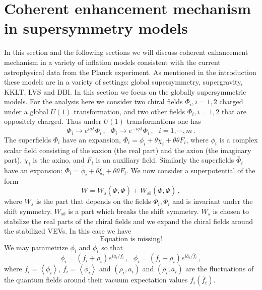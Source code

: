 \documentclass[12pt]{article}
\begin{document}
\section{Coherent enhancement mechanism in supersymmetry models \label{sec:Supersymmetry}}
In this section and the following sections we will discuss coherent enhancement mechanism in a variety of inflation models consistent with the current astrophysical data from the Planck experiment.
As mentioned in the introduction these models are in a variety of settings: global supersymmetry, supergravity, KKLT, LVS and DBI.
In this section we focus on the globally supersymmetric models.
For the analysis here we consider two chiral fields $\Phi_i, i = 1, 2$ charged under a global $U\left(1\right)$ transformation, and two other fields $\bar\Phi_i, i = 1, 2$ that are oppositely charged.
Thus under $U\left(1\right)$ transformations one has
\begin{equation}
  \Phi_i \to e^{i q \lambda} \Phi_i\,,
  ~~~ \bar\Phi_i \to e^{-i q \lambda} \bar\Phi_i\,,
  ~~~ i = 1, \cdots, m\,.
\end{equation}
The superfields $\Phi_i$ have an expansion, $\Phi_i = \phi_i + \theta \chi_i + \theta \theta F_i$, where $\phi_i$ is a complex scalar field consisting of the saxion (the real part) and the axion (the imaginary part), $\chi_i$ is the axino, and $F_i$ is an auxiliary field.
Similarly the superfields $\bar\Phi_i$ have an expansion: $\bar\Phi_i = \bar\phi_i + \bar\theta \bar\xi_i + \bar\theta \bar\theta \bar F_i$.
We now consider a superpotential of the form
\begin{equation} \label{eq:supersymmetry:W}
  W = W_s\left(\Phi, \bar\Phi\right) + W_{sb}\left(\Phi, \bar\Phi\right)\,,
\end{equation}
where $W_s$ is the part that depends on the fields $\Phi_i, \bar\Phi_i$ and is invariant under the shift symmetry.
$W_{sb}$ is a part which breaks the shift symmetry.
$W_s$ is chosen to stabilize the real parts of the chiral fields and we expand the chiral fields around the stabilized VEVs.
In this case we have
\begin{equation}
  \text{Equation is missing!}
\end{equation}
We may parametrize $\phi_i$ and $\bar\phi_i$ so that
\begin{equation}
  \phi_i = \left(f_i + \rho_i\right) e^{i a_i / f_i}\,,
  ~~~ \bar\phi_i = \left(\bar f_i + \bar\rho_i\right) e^{i \bar a_i / \bar f_i}\,,
\end{equation}
where $f_i = \left<\phi_i\right>$, $\bar f_i = \left<\bar\phi_i\right>$ and $\left(\rho_i, a_i\right)$ and $\left(\bar\rho_i, \bar a_i\right)$ are the fluctuations of the quantum fields around their vacuum expectation values $f_i\left(\bar f_i\right)$.
\end{document}
